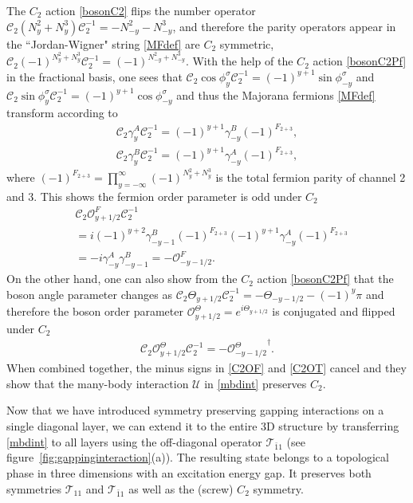 The $C_2$ action \eqref{bosonC2} flips the number operator $\mathcal{C}_2(N_y^2+N_y^3)\mathcal{C}_2^{-1}=-N_{-y}^2-N_{-y}^3$, and therefore the parity operators appear in the ``Jordan-Wigner" string \eqref{MFdef} are $C_2$ symmetric, $\mathcal{C}_2(-1)^{N_y^2+N_y^3}\mathcal{C}_2^{-1}=(-1)^{N_{-y}^2+N_{-y}^3}$. With the help of the $C_2$ action \eqref{bosonC2Pf} in the fractional basis, one sees that $\mathcal{C}_2\cos\phi^\sigma_y\mathcal{C}_2^{-1}=(-1)^{y+1}\sin\phi^\sigma_{-y}$ and $\mathcal{C}_2\sin\phi^\sigma_y\mathcal{C}_2^{-1}=(-1)^{y+1}\cos\phi^\sigma_{-y}$ and thus the Majorana fermions \eqref{MFdef} transform according to \begin{align}\mathcal{C}_2\gamma^A_y\mathcal{C}_2^{-1}=(-1)^{y+1}\gamma^B_{-y}(-1)^{F_{2+3}},\\\mathcal{C}_2\gamma^B_y\mathcal{C}_2^{-1}=(-1)^{y+1}\gamma^A_{-y}(-1)^{F_{2+3}},\nonumber\end{align} where $(-1)^{F_{2+3}}=\prod_{y=-\infty}^\infty(-1)^{N_y^2+N_y^3}$ is the total fermion parity of channel 2 and 3. This shows the fermion order parameter is odd under $C_2$ \begin{align}&\mathcal{C}_2\mathcal{O}^F_{y+1/2}\mathcal{C}_2^{-1}\nonumber\\&=i(-1)^{y+2}\gamma^B_{-y-1}(-1)^{F_{2+3}}(-1)^{y+1}\gamma^A_{-y}(-1)^{F_{2+3}}\nonumber\\&=-i\gamma^A_{-y}\gamma^B_{-y-1}=-\mathcal{O}^F_{-y-1/2}.\label{C2OF}\end{align} On the other hand, one can also show from the $C_2$ action \eqref{bosonC2Pf} that the boson angle parameter changes as $\mathcal{C}_2\Theta_{y+1/2}\mathcal{C}_2^{-1}=-\Theta_{-y-1/2}-(-1)^y\pi$ and therefore the boson order parameter $\mathcal{O}^\Theta_{y+1/2}=e^{i\Theta_{y+1/2}}$ is conjugated and flipped under $C_2$ \begin{align}\mathcal{C}_2\mathcal{O}^\Theta_{y+1/2}\mathcal{C}_2^{-1}=-{\mathcal{O}^\Theta_{-y-1/2}}^\dagger.\label{C2OT}\end{align} When combined together, the minus signs in \eqref{C2OF} and \eqref{C2OT} cancel and they show that the many-body interaction $\mathcal{U}$ in \eqref{mbdint} preserves $C_2$.

Now that we have introduced symmetry preserving gapping interactions on a single diagonal layer, we can extend it to the entire 3D structure by transferring \eqref{mbdint} to all layers using the off-diagonal \AFTR operator $\mathcal{T}_{\bar{1}1}$ (see figure~\ref{fig:gappinginteraction}(a)). The resulting state belongs to a topological phase in three dimensions with an excitation energy gap. It preserves both \AFTR symmetries $\mathcal{T}_{11}$ and $\mathcal{T}_{\bar{1}1}$ as well as the (screw) $C_2$ symmetry.


